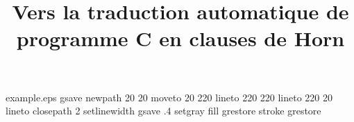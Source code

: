 %
%
%
%
%




\begin{filecontents*}{example.eps}
gsave
newpath
  20 20 moveto
  20 220 lineto
  220 220 lineto
  220 20 lineto
closepath
2 setlinewidth
gsave
  .4 setgray fill
grestore
stroke
grestore
\end{filecontents*}
%
\RequirePackage{fix-cm}
%
\documentclass[smallextended]{svjour3}       %

%
\smartqed  %
%
\usepackage[francais]{babel}
\usepackage{graphicx}
\usepackage[utf8]{inputenc}  
\usepackage{eurosym}
\usepackage{rotfloat}
\usepackage{amsmath}
\usepackage{amssymb}
%
%
%
%
%
\setlength\abovecaptionskip{0.25ex}
\setlength\belowcaptionskip{0.25ex}


\title{Vers la traduction automatique de programme C en clauses de Horn\smallberak%

}

